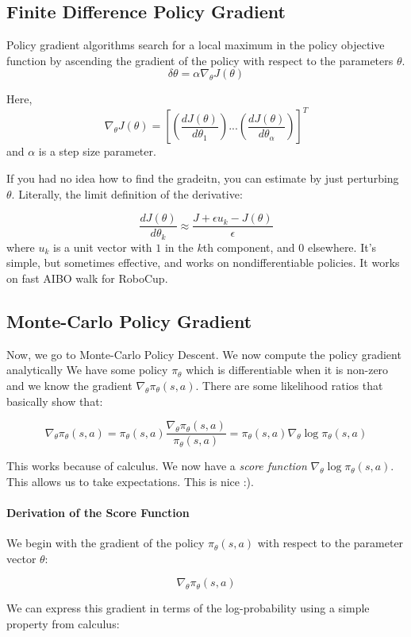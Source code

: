 \documentclass[10pt, oneside]{article}
\theoremstyle{definition}
\begin{document}
\subsection{Finite Difference Policy Gradient}
Policy gradient algorithms search for a local maximum in the policy objective function by ascending the gradient of the policy with respect to the parameters $\theta$. 
\[\delta\theta = \alpha \nabla_\theta J(\theta)\]  

Here, 
\[\nabla_\theta J(\theta) = [(\frac{dJ(\theta)}{d\theta_1})... (\frac{dJ(\theta)}{d\theta_\alpha})]^T  \]
and $\alpha$ is a step size parameter. 

If you had no idea how to find the gradeitn, you can estimate by just perturbing $\theta$. Literally, the limit definition of the derivative:

\[\frac{dJ(\theta)}{d\theta_k} \approx \frac{J + \epsilon u_k - J(\theta)}
{\epsilon}   \]
where $u_k$ is a unit vector with $1$ in the $k$th component, and $0$ elsewhere. It's simple, but sometimes effective, and works on nondifferentiable policies. It works on fast AIBO walk for RoboCup. 
\subsection{Monte-Carlo Policy Gradient}
Now, we go to Monte-Carlo Policy Descent. We now compute the policy gradient analytically We have some policy $\pi_\theta$ which is differentiable when it is non-zero and we know the gradient $\nabla_\theta \pi_\theta (s,a)$. There are some likelihood ratios that basically show that:

\[ \nabla_\theta \pi_\theta (s,a) = \pi_\theta (s,a) \frac{\nabla_\theta \pi_\theta (s,a)}{\pi_\theta (s,a)} =  \pi_\theta (s,a) \nabla_\theta \log{ \pi_\theta (s,a)} \]

This works because of calculus. 
We now have a \textit{score function} $\nabla_\theta \log{ \pi_\theta (s,a)}$. This allows us to take expectations. This is nice :). 
\paragraph{Derivation of the Score Function}

We begin with the gradient of the policy $\pi_\theta(s, a)$ with respect to the parameter vector $\theta$:

\[
\nabla_\theta \pi_\theta(s, a)
\]

We can express this gradient in terms of the log-probability using a simple property from calculus:
\end{document}
